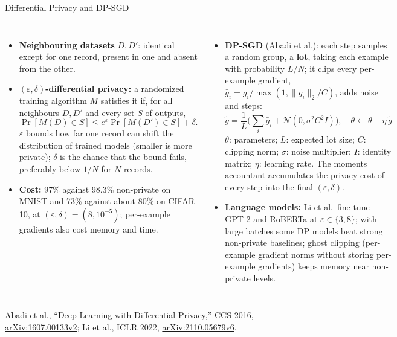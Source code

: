\begin{frame}{Differential Privacy and DP-SGD}
  \begin{columns}[T,onlytextwidth]
      \begin{itemize}\footnotesize\itemsep0.2em
        \item[\textcolor{red}{$\blacktriangleright$}] \textbf{Neighbouring datasets} $D, D'$: identical except for one record, present in one and absent from the other.
        \item[\textcolor{red}{$\blacktriangleright$}] \textbf{$(\varepsilon,\delta)$-differential privacy:} a randomized training algorithm $M$ satisfies it if, for all neighbours $D, D'$ and every set $S$ of outputs,
          \[ \Pr[M(D) \in S] \leq e^{\varepsilon} \Pr[M(D') \in S] + \delta . \]
          $\varepsilon$ bounds how far one record can shift the distribution of trained models (smaller is more private); $\delta$ is the chance that the bound fails, preferably below $1/N$ for $N$ records.
        \item[\textcolor{red}{$\blacktriangleright$}] \textbf{Cost:} 97\% against 98.3\% non-private on MNIST and 73\% against about 80\% on CIFAR-10, at $(\varepsilon,\delta) = (8, 10^{-5})$; per-example gradients also cost memory and time.
      \end{itemize}
      \begin{itemize}\footnotesize\itemsep0.2em
        \item[\textcolor{red}{$\blacktriangleright$}] \textbf{DP-SGD} (Abadi et al.): each step samples a random group, a \textbf{lot}, taking each example with probability $L/N$; it clips every per-example gradient, $\bar g_i = g_i / \max(1, \|g_i\|_2 / C)$, adds noise and steps:
          \[ \tilde g = \frac{1}{L}\Big(\sum_i \bar g_i + \mathcal{N}(0, \sigma^2 C^2 I)\Big), \quad \theta \leftarrow \theta - \eta\, \tilde g \]
          $\theta$: parameters; $L$: expected lot size; $C$: clipping norm; $\sigma$: noise multiplier; $I$: identity matrix; $\eta$: learning rate. The moments accountant accumulates the privacy cost of every step into the final $(\varepsilon,\delta)$.
        \item[\textcolor{red}{$\blacktriangleright$}] \textbf{Language models:} Li et al.\ fine-tune GPT-2 and RoBERTa at $\varepsilon \in \{3, 8\}$; with large batches some DP models beat strong non-private baselines; ghost clipping (per-example gradient norms without storing per-example gradients) keeps memory near non-private levels.
      \end{itemize}
  \end{columns}
  \vspace{0.1em}
  {\scriptsize Abadi et al., ``Deep Learning with Differential Privacy,'' CCS 2016, \href{https://arxiv.org/abs/1607.00133v2}{arXiv:1607.00133v2}; Li et al., ICLR 2022, \href{https://arxiv.org/abs/2110.05679v6}{arXiv:2110.05679v6}.}
\end{frame}

